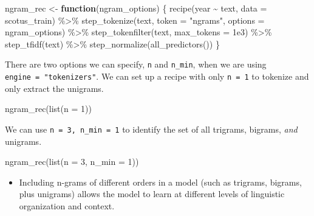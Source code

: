 \documentclass[
]{krantz}
\makeatletter
\newenvironment{Shaded}{\begin{snugshade}}{\end{snugshade}}
\newcommand{\AttributeTok}[1]{\textcolor[rgb]{0.77,0.63,0.00}{#1}}
\newcommand{\ControlFlowTok}[1]{\textcolor[rgb]{0.13,0.29,0.53}{\textbf{#1}}}
\newcommand{\DecValTok}[1]{\textcolor[rgb]{0.00,0.00,0.81}{#1}}
\newcommand{\FloatTok}[1]{\textcolor[rgb]{0.00,0.00,0.81}{#1}}
\newcommand{\FunctionTok}[1]{\textcolor[rgb]{0.00,0.00,0.00}{#1}}
\newcommand{\NormalTok}[1]{#1}
\newcommand{\OtherTok}[1]{\textcolor[rgb]{0.56,0.35,0.01}{#1}}
\newcommand{\SpecialCharTok}[1]{\textcolor[rgb]{0.00,0.00,0.00}{#1}}
\newcommand{\StringTok}[1]{\textcolor[rgb]{0.31,0.60,0.02}{#1}}
\newenvironment{kframe}{%
\medskip{}
\setlength{\fboxsep}{.8em}
 \def\at@end@of@kframe{}%
 \ifinner\ifhmode%
  \def\at@end@of@kframe{\end{minipage}}%
  \begin{minipage}{\columnwidth}%
 \fi\fi%
 \def\FrameCommand##1{\hskip\@totalleftmargin \hskip-\fboxsep
 \colorbox{shadecolor}{##1}\hskip-\fboxsep
     \hskip-\linewidth \hskip-\@totalleftmargin \hskip\columnwidth}%
 \MakeFramed {\advance\hsize-\width
   \@totalleftmargin\z@ \linewidth\hsize
   \@setminipage}}%
 {\par\unskip\endMakeFramed%
 \at@end@of@kframe}
\renewenvironment{Shaded}{\begin{kframe}}{\end{kframe}}
\newenvironment{rmdblock}[1]
  {\begin{shaded*}
  \begin{itemize}[left = -1cm, labelsep = 1cm]
  \renewcommand{\labelitemi}{
    \raisebox{-.7\height}[0pt][0pt]{
      {\setkeys{Gin}{width=3em,keepaspectratio}\texttt{[image: images/\#1]}}
    }
  }
 
  \item
  }
  {
  \end{itemize}
  \end{shaded*}
  }
\newenvironment{rmdnote}
  {\begin{rmdblock}{note}}
  {\end{rmdblock}}
\makeatother
\begin{document}
\begin{Shaded}
\begin{Highlighting}[]
\NormalTok{ngram\_rec }\OtherTok{\textless{}{-}} \ControlFlowTok{function}\NormalTok{(ngram\_options) \{}
  \FunctionTok{recipe}\NormalTok{(year }\SpecialCharTok{\textasciitilde{}}\NormalTok{ text, }\AttributeTok{data =}\NormalTok{ scotus\_train) }\SpecialCharTok{\%\textgreater{}\%}
    \FunctionTok{step\_tokenize}\NormalTok{(text, }\AttributeTok{token =} \StringTok{"ngrams"}\NormalTok{, }\AttributeTok{options =}\NormalTok{ ngram\_options) }\SpecialCharTok{\%\textgreater{}\%}
    \FunctionTok{step\_tokenfilter}\NormalTok{(text, }\AttributeTok{max\_tokens =} \FloatTok{1e3}\NormalTok{) }\SpecialCharTok{\%\textgreater{}\%}
    \FunctionTok{step\_tfidf}\NormalTok{(text) }\SpecialCharTok{\%\textgreater{}\%}
    \FunctionTok{step\_normalize}\NormalTok{(}\FunctionTok{all\_predictors}\NormalTok{())}
\NormalTok{\}}
\end{Highlighting}
\end{Shaded}

There are two options we can specify, \texttt{n} and \texttt{n\_min}, when we are using \texttt{engine\ =\ "tokenizers"}. We can set up a recipe with only \texttt{n\ =\ 1} to tokenize and only extract the unigrams.

\begin{Shaded}
\begin{Highlighting}[]
\FunctionTok{ngram\_rec}\NormalTok{(}\FunctionTok{list}\NormalTok{(}\AttributeTok{n =} \DecValTok{1}\NormalTok{))}
\end{Highlighting}
\end{Shaded}

We can use \texttt{n\ =\ 3,\ n\_min\ =\ 1} to identify the set of all trigrams, bigrams, \emph{and} unigrams.

\begin{Shaded}
\begin{Highlighting}[]
\FunctionTok{ngram\_rec}\NormalTok{(}\FunctionTok{list}\NormalTok{(}\AttributeTok{n =} \DecValTok{3}\NormalTok{, }\AttributeTok{n\_min =} \DecValTok{1}\NormalTok{))}
\end{Highlighting}
\end{Shaded}

\begin{rmdnote}
Including n-grams of different orders in a model (such as trigrams,
bigrams, plus unigrams) allows the model to learn at different levels of
linguistic organization and context.
\end{rmdnote}
\end{document}
